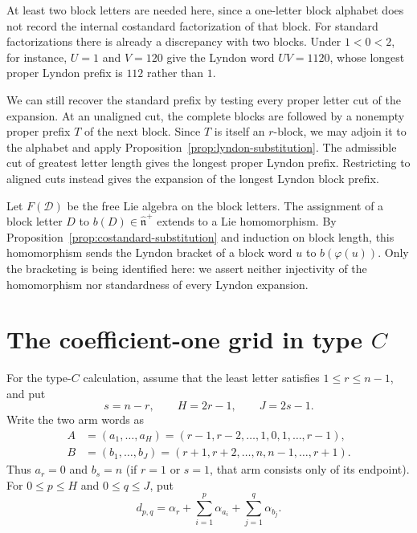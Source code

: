 \documentclass[11pt]{amsart}
\numberwithin{equation}{section}
\theoremstyle{definition}
\newcommand{\nhat}{\widehat{\mathfrak n}^{+}}
\newcommand{\br}[1]{b(#1)}
\begin{document}
At least two block letters are needed here, since a one-letter block alphabet does not record the internal costandard factorization of that block. For standard factorizations there is already a discrepancy with two blocks. Under $1<0<2$, for instance, $U=1$ and $V=120$ give the Lyndon word $UV=1120$, whose longest proper Lyndon prefix is $112$ rather than $1$.

We can still recover the standard prefix by testing every proper letter cut of the expansion. At an unaligned cut, the complete blocks are followed by a nonempty proper prefix $T$ of the next block. Since $T$ is itself an $r$-block, we may adjoin it to the alphabet and apply Proposition~\ref{prop:lyndon-substitution}. The admissible cut of greatest letter length gives the longest proper Lyndon prefix. Restricting to aligned cuts instead gives the expansion of the longest Lyndon block prefix.

Let $F(\mathcal D)$ be the free Lie algebra on the block letters. The assignment of a block letter $D$ to $\br{D}\in\nhat$ extends to a Lie homomorphism. By Proposition~\ref{prop:costandard-substitution} and induction on block length, this homomorphism sends the Lyndon bracket of a block word $u$ to $\br{\varphi(u)}$. Only the bracketing is being identified here: we assert neither injectivity of the homomorphism nor standardness of every Lyndon expansion.

\section{The coefficient-one grid in type \texorpdfstring{$C$}{C}}\label{sec:grid}

For the type-$C$ calculation, assume that the least letter satisfies $1\leq r\leq n-1$, and put
\[
 s=n-r,\qquad H=2r-1,\qquad J=2s-1.
\]
Write the two arm words as
\begin{align*}
 A&=(a_1,\ldots,a_H)=(r-1,r-2,\ldots,1,0,1,\ldots,r-1),\\
 B&=(b_1,\ldots,b_J)=(r+1,r+2,\ldots,n,n-1,\ldots,r+1).
\end{align*}
Thus $a_r=0$ and $b_s=n$ (if $r=1$ or $s=1$, that arm consists only of its endpoint). For $0\leq p\leq H$ and $0\leq q\leq J$, put
\[
 d_{p,q}=\alpha_r+\sum_{i=1}^p\alpha_{a_i}
                         +\sum_{j=1}^q\alpha_{b_j}.
\]
\end{document}

